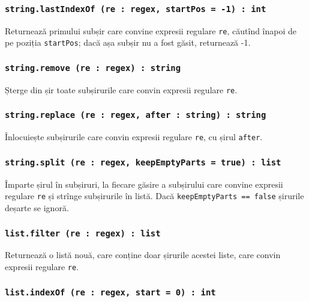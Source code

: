 \subsubsection{\texttt{string.lastIndexOf (re : regex, startPos = -1) : int}}

Returnează primului subșir care convine expresii regulare \texttt{re}, căutînd înapoi de pe poziția \texttt{startPos}; dacă așa subșir nu a fost găsit, returnează -1.

\subsubsection{\texttt{string.remove (re : regex) : string}}

Șterge din șir toate subșirurile care convin expresii regulare \texttt{re}.

\subsubsection{\texttt{string.replace (re : regex, after : string) : string}}

Înlocuiește subșirurile care convin expresii regulare \texttt{re}, cu șirul \texttt{after}.

\subsubsection{\texttt{string.split (re : regex, keepEmptyParts = true) : list}}

Împarte șirul în subșiruri, la fiecare găsire a subșirului care convine expresii regulare \texttt{re} și strînge subșirurile în listă. Dacă \texttt{keepEmptyParts == false} șirurile deșarte se ignoră.

\subsubsection{\texttt{list.filter (re : regex) : list}}

Returnează o listă nouă, care conține doar șirurile acestei liste, care convin expresii regulare \texttt{re}.

\subsubsection{\texttt{list.indexOf (re : regex, start = 0) : int}}

